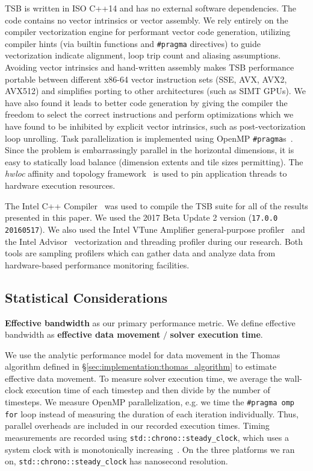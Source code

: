 \documentclass{sig-alternate-05-2015}
\begin{document}
TSB is written in ISO C++14 and has no external software dependencies.
The code contains no vector intrinsics or vector assembly.
We rely entirely on the compiler vectorization engine for performant vector code
  generation, utilizing compiler hints (via builtin functions and
  \lstinline{#pragma} directives) to guide vectorization indicate alignment, loop
  trip count and aliasing assumptions.
Avoiding vector intrinsics and hand-written assembly makes TSB performance
  portable between different x86-64 vector instruction sets (SSE, AVX, AVX2,
  AVX512) and simplifies porting to other architectures (such as SIMT GPUs).
We have also found it leads to better code generation by giving the compiler
  the freedom to select the correct instructions and perform optimizations which
  we have found to be inhibited by explicit vector intrinsics, such as
  post-vectorization loop unrolling.
Task parallelization is implemented using OpenMP
  \lstinline{#pragma}s~\cite{openmp}.
Since the problem is embarrassingly parallel in the horizontal dimensions, it
  is easy to statically load balance (dimension extents and tile sizes
  permitting).
The \emph{hwloc} affinity and topology framework~\cite{hwloc} is used to pin
  application threads to hardware execution resources.

The Intel C++ Compiler~\cite{intel_cpp_compiler} was used to compile the TSB
  suite for all of the results presented in this paper.
We used the 2017 Beta Update 2 version (\lstinline{17.0.0 20160517}).
We also used the Intel VTune Amplifier general-purpose
  profiler~\cite{intel_vtune_amplifier} and the Intel
  Advisor~\cite{intel_advisor} vectorization and threading profiler during our
  research.
Both tools are sampling profilers which can gather data and analyze data from
  hardware-based performance monitoring facilities.

\subsection{Statistical Considerations}
\label{sec:experimental_setup:stats}

\textbf{Effective bandwidth} as our primary performance metric.
We define effective bandwidth as \textbf{effective data movement} \(/\)
  \textbf{solver execution time}.

We use the analytic performance model for data movement in the Thomas algorithm
  defined in \S\ref{sec:implementation:thomas_algorithm} to estimate effective
  data movement.
To measure solver execution time, we average the wall-clock execution time of
  each timestep and then divide by the number of timesteps.
We measure OpenMP parallelization, e.g. we time the \lstinline{#pragma omp for}
  loop instead of measuring the duration of each iteration individually.
Thus, parallel overheads are included in our recorded execution times.
Timing measurements are recorded using \lstinline{std::chrono::steady_clock},
  which uses a system clock with is monotonically
  increasing~\cite{cxx14}.
On the three platforms we ran on, \lstinline{std::chrono::steady_clock} has
  nanosecond resolution.
\end{document}
